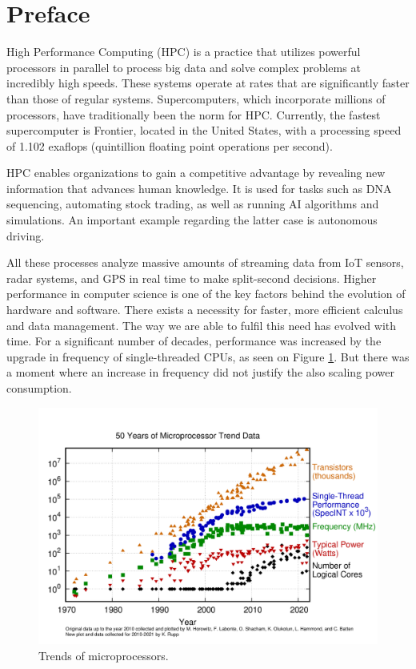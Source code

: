 %
%

\chapter*{Preface}

High Performance Computing (HPC) \cite{Assiroj:2018:High} is a practice that utilizes powerful processors in parallel to process big data and solve complex problems at incredibly high speeds.
These systems operate at rates that are significantly faster than those of regular systems.
Supercomputers, which incorporate millions of processors, have traditionally been the norm for HPC.
Currently, the fastest supercomputer is Frontier, located in the United States, with a processing speed of 1.102 exaflops (quintillion floating point operations per second).

HPC enables organizations to gain a competitive advantage by revealing new information that advances human knowledge.
It is used for tasks such as DNA sequencing, automating stock trading, as well as running AI algorithms and simulations.
An important example regarding the latter case is autonomous driving.

All these processes analyze massive amounts of streaming data from IoT sensors, radar systems, and GPS in real time to make split-second decisions.
Higher performance in computer science is one of the key factors behind the evolution of hardware and software.
There exists a necessity for faster, more efficient calculus and data management.
The way we are able to fulfil this need has evolved with time.
For a significant number of decades, performance was increased by the upgrade in frequency of single-threaded CPUs, as seen on Figure \ref{fig:processor-trend}.
But there was a moment where an increase in frequency did not justify the also scaling power consumption.

\begin{figure}[H]
	\centering
	\includegraphics[width=\linewidth]{images/50-years-processor-trend.png}
	\caption{Trends of microprocessors.}
	\label{fig:processor-trend}
\end{figure}

